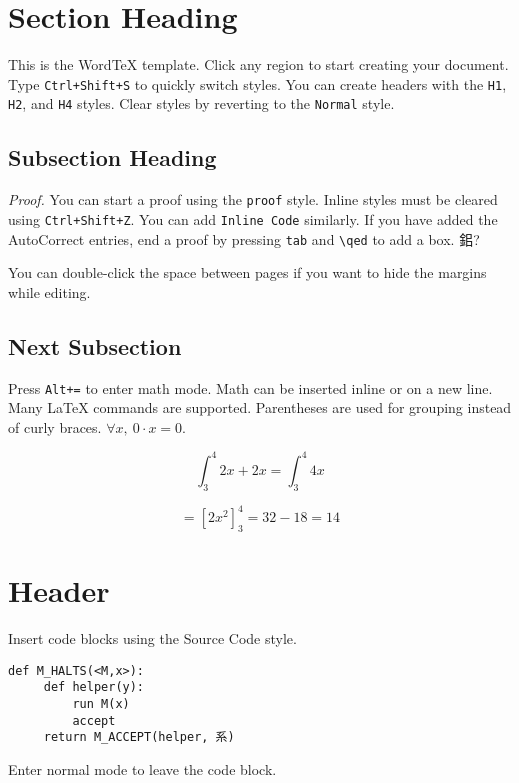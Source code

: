 \documentclass[11pt]{article}
\begin{document}
\section{Section Heading}\label{section-heading}

This is the WordTeX template. Click any region to start creating your
document. Type \texttt{Ctrl+Shift+S} to quickly switch styles. You can
create headers with the \texttt{H1}, \texttt{H2}, and \texttt{H4}
styles. Clear styles by reverting to the \texttt{Normal} style.

\subsection{Subsection Heading}\label{subsection-heading}

\emph{Proof.} You can start a proof using the \texttt{proof} style.
Inline styles must be cleared using \texttt{Ctrl+Shift+Z}. You can add
\texttt{Inline\ Code} similarly. If you have added the AutoCorrect
entries, end a proof by pressing \texttt{tab} and
\texttt{\textbackslash{}qed} to add a box. 鈻?

You can double-click the space between pages if you want to hide the
margins while editing.

\subsection{Next Subsection}\label{next-subsection}

Press \texttt{Alt+=} to enter math mode. Math can be inserted inline or
on a new line. Many LaTeX commands are supported. Parentheses are used
for grouping instead of curly braces. \(\forall x,\ 0 \cdot x = 0\).

\[\int_{3}^{4}{2x + 2x} = \int_{3}^{4}{4x}\]

\[
{= \left\lbrack 2x^{2} \right\rbrack_{3}^{4}
}{= 32 - 18
}{= 14}\]

\section{Header}\label{header}

Insert code blocks using the Source Code style.

\begin{verbatim}
def M_HALTS(<M,x>):
     def helper(y):
         run M(x)
         accept
     return M_ACCEPT(helper, 系)
\end{verbatim}

Enter normal mode to leave the code block.
\end{document}
